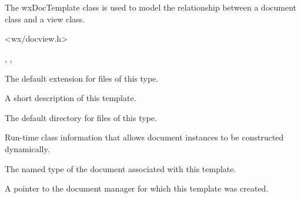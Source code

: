 \section{}\label{wxdoctemplate}

The wxDocTemplate class is used to model the relationship between a
document class and a view class.




<wx/docview.h>


, , 




The default extension for files of this type.



A short description of this template.



The default directory for files of this type.



Run-time class information that allows document instances to be constructed dynamically.



The named type of the document associated with this template.



A pointer to the document manager for which this template was created.


